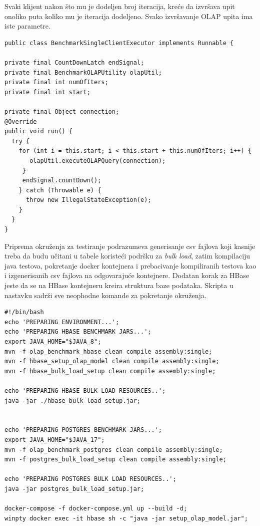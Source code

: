 \documentclass[12pt,oneside]{memoir}
\begin{document}
Svaki klijent nakon što mu je dodeljen broj iteracija, kreće da izvršava upit onoliko puta koliko mu je iteracija dodeljeno. Svako izvršavanje OLAP upita ima iste parametre.


\begin{lstlisting}[title={BenchmarkSingleClientExecutor.java - Posao klijenta},captionpos=b]
public class BenchmarkSingleClientExecutor implements Runnable {

private final CountDownLatch endSignal;
private final BenchmarkOLAPUtility olapUtil;
private final int numOfIters;
private final int start;

private final Object connection;
@Override
public void run() {
  try {
    for (int i = this.start; i < this.start + this.numOfIters; i++) {
       olapUtil.executeOLAPQuery(connection);
     }
     endSignal.countDown();
    } catch (Throwable e) {
      throw new IllegalStateException(e);
    }
  }
}
\end{lstlisting}

Priprema okruženja za testiranje podrazumeva generisanje csv fajlova koji kasnije treba da budu učitani u tabele koristeći podršku za \textit{bulk load}, zatim kompilaciju java testova, pokretanje docker kontejnera i prebacivanje kompiliranih testova kao i izgenerisanih csv fajlova na odgovarajuće kontejnere. Dodatan korak za HBase jeste da se na HBase kontejneru kreira struktura baze podataka. Skripta u nastavku sadrži sve neophodne komande za pokretanje okruženja.

\begin{lstlisting}[title={prepareEnv.sh - Skripta za pokretanje OLAP okruženja},captionpos=b]
#!/bin/bash
echo 'PREPARING ENVIRONMENT...';
echo 'PREPARING HBASE BENCHMARK JARS...';
export JAVA_HOME="$JAVA_8";
mvn -f olap_benchmark_hbase clean compile assembly:single;
mvn -f hbase_setup_olap_model clean compile assembly:single;
mvn -f hbase_bulk_load_setup clean compile assembly:single;

echo 'PREPARING HBASE BULK LOAD RESOURCES..';
java -jar ./hbase_bulk_load_setup.jar;


echo 'PREPARING POSTGRES BENCHMARK JARS...';
export JAVA_HOME="$JAVA_17";
mvn -f olap_benchmark_postgres clean compile assembly:single;
mvn -f postgres_bulk_load_setup clean compile assembly:single;

echo 'PREPARING POSTGRES BULK LOAD RESOURCES..';
java -jar postgres_bulk_load_setup.jar;

docker-compose -f docker-compose.yml up --build -d;
winpty docker exec -it hbase sh -c "java -jar setup_olap_model.jar";
\end{lstlisting}
\end{document}
